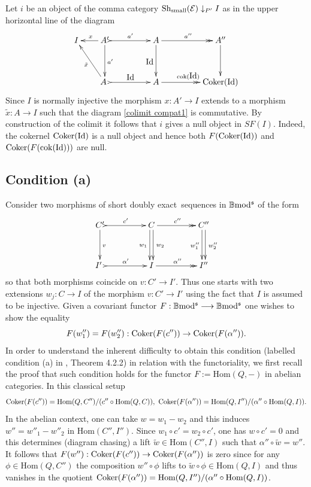 \documentclass[12pt]{article}
\makeatletter
\def\Hom{{\rm Hom}}
\def\id{{\rm id}}
\def\coker{{\rm Coker}}
\def\scoker{{\rm cok}}
\def\B{{\mathbb B}}
\def\exxx{{doubly exact}~}
\def\cE{{\mathcal E}}
\def\dar[#1]{\ar@<2pt>[#1]\ar@<-2pt>[#1]}
\def\id{{\mbox{Id}}}
\def\Hom {{\mbox{Hom}}}
\def\sequ{{\rm Sh}}
\def\b2{{\rm \B mod^{\mathfrak s}}}
\makeatother
\begin{document}
\proof Let $i$ be an object of the comma category $\sequ_{\rm small}(\cE)\downarrow_{P'} I$
as in the upper horizontal line of the diagram
\begin{equation}\label{colimit compat1}
\xymatrix@C=20pt@R=35pt{
I&  A' \ar[l]_{x}\ar[d]^{a'}\ar@{>->}[rr]^{a'} && A\ar[d]_{\id} \ar@{->>}[rr]^{a''}&& A''\ar[d]
\\
 & \ar[ul]^{\tilde x}A \ \ar@{>->}[rr]^{\id}&& A \ar@{->>}[rr]^{\scoker(\id)}&& \coker(\id) }
\end{equation}
Since $I$ is normally injective the morphism $x:A'\to I$ extends to a morphism $\tilde x:A\to I$ such that the diagram \eqref{colimit compat1} is commutative. By construction of the colimit it follows that $i$ gives a null object in $SF(I)$. Indeed, the cokernel $\coker(\id)$ is a null object and hence both $F(\coker(\id))$
and $\coker(F(\scoker(\id)))$ are null. \endproof 

  \subsection{Condition (a)}\label{sect condition a}

Consider two morphisms of short \exxx sequences in $\b2$ of the form
\begin{equation}\label{weakly final abelian}
\xymatrix@C=20pt@R=35pt{
  C'\ar[d]^{v}\ar@{>->}[rr]^{c'} && C \dar[d]_{w_1}^{\ \, w_2} \ar@{->>}[rr]^{c''}&& C''\dar[d]_{w''_1}^{\ \, w''_2}
\\
I' \ \ar@{>->}[rr]^{\alpha'}&& I \ar@{->>}[rr]^{\alpha''}&& I''}
\end{equation}
so that both morphisms coincide on $v:C'\to I'$. Thus one starts with two extensions $w_j:C\to I$ of the morphism $v:C'\to I'$ using the fact that $I$ is assumed to be injective.  Given a covariant functor 
$F:\b2\longrightarrow \b2$ one wishes to show the equality 
\begin{equation}\label{grandis condition}
F(w''_1)=F(w''_2): \coker(F(c''))\to \coker(F(\alpha'')).	
\end{equation}
In order to understand the inherent difficulty to obtain this condition (labelled condition (a) in \cite{gra1}, Theorem 4.2.2) in relation with the functoriality, we first recall the proof that such condition holds for the functor $F:=\Hom(Q,-)$ in abelian categories. In this classical setup  
$$
\coker(F(c''))=\Hom(Q,C'')/(c''\circ \Hom(Q,C)), \ 
\coker(F(\alpha''))=\Hom(Q,I'')/(\alpha''\circ \Hom(Q,I)).
$$
In the abelian context, one can take $w=w_1-w_2$ and this induces $w''=w''_1-w''_2$ in $\Hom(C'',I'')$. Since $w_1\circ c'=w_2\circ c'$, one has $w\circ c'=0$ and this determines (diagram chasing) a lift $\tilde w\in \Hom(C'',I)$ such that $\alpha''\circ \tilde w=w''$. It follows that
$F(w''): \coker(F(c''))\to \coker(F(\alpha''))$ is zero since for any $\phi\in \Hom(Q,C'')$
the composition $w''\circ \phi$ lifts to $\tilde w\circ \phi\in \Hom(Q,I)$ and thus vanishes in the quotient $\coker(F(\alpha''))=\Hom(Q,I'')/(\alpha''\circ \Hom(Q,I))$.\vspace{.05in}
\end{document}
